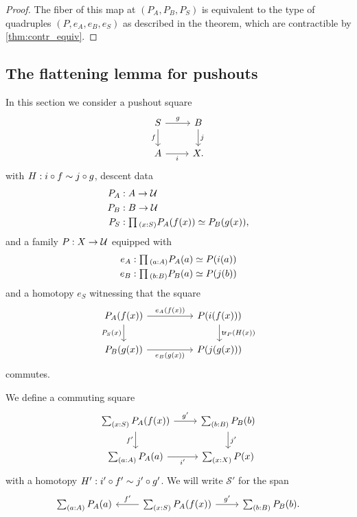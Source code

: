 \begin{proof}
The fiber of this map at $(P_A,P_B,P_S)$ is equivalent to the type of quadruples $(P,e_A,e_B,e_S)$ as described in the theorem, which are contractible by \cref{thm:contr_equiv}.
\end{proof}

\subsection{The flattening lemma for pushouts}

In this section we consider a pushout square
\begin{equation*}
\begin{tikzcd}
S \arrow[r,"g"] \arrow[d,swap,"f"] & B \arrow[d,"j"] \\
A \arrow[r,swap,"i"] & X.
\end{tikzcd}
\end{equation*}
with $H:i\circ f\sim j\circ g$, descent data
\begin{align*}
P_A & : A \to \UU \\
P_B & : B \to \UU \\
P_S & : \prd{x:S} \eqv{P_A(f(x))}{P_B(g(x))},
\end{align*}
and a family $P:X\to\mathcal{U}$ equipped with 
\begin{align*}
e_A & : \prd{a:A}\eqv{P_A(a)}{P(i(a))} \\
e_B & : \prd{b:B}\eqv{P_B(a)}{P(j(b))}
\end{align*}
and a homotopy $e_S$ witnessing that the square
\begin{equation*}
\begin{tikzcd}[column sep=huge]
P_A(f(x)) \arrow[r,"e_A(f(x))"] \arrow[d,swap,"P_S(x)"] & P(i(f(x))) \arrow[d,"\mathsf{tr}_P(H(x))"] \\
P_B(g(x)) \arrow[r,swap,"e_B(g(x))"] & P(j(g(x)))
\end{tikzcd}
\end{equation*}
commutes.

\begin{defn}
We define a commuting square
\begin{equation*}
\begin{tikzcd}
\sm{x:S}P_A(f(x)) \arrow[d,swap,"{f'}"] \arrow[r,"{g'}"] & \sm{b:B}P_B(b) \arrow[d,"{j'}"] \\
\sm{a:A}P_A(a) \arrow[r,swap,"{i'}"] & \sm{x:X}P(x)
\end{tikzcd}
\end{equation*}
with a homotopy $H':i'\circ f'\sim j'\circ g'$. We will write $\mathcal{S'}$ for the span
\begin{equation*}
\begin{tikzcd}
\sm{a:A}P_A(a) & \sm{x:S}P_A(f(x)) \arrow[l,swap,"{f'}"] \arrow[r,"{g'}"] & \sm{b:B}P_B(b).
\end{tikzcd}
\end{equation*}
\end{defn}

